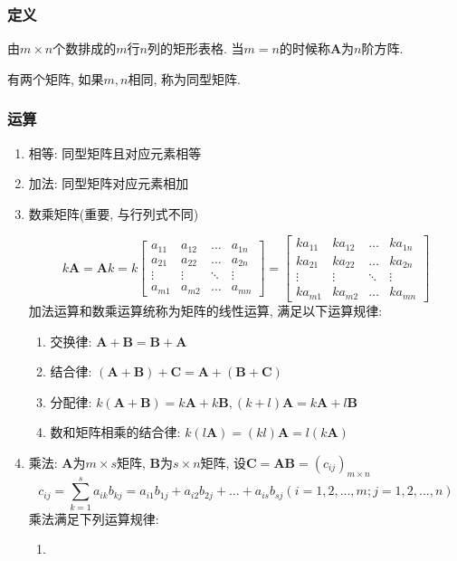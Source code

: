 \subsubsection{定义}
由$ m\times n $个数排成的$ m $行$ n $列的矩形表格. 当$ m=n $的时候称$ \bm{A} $为$ n $阶方阵.\par 有两个矩阵, 如果$ m,n $相同, 称为同型矩阵.
\subsubsection{运算}
\begin{enumerate}
	\item 相等: 同型矩阵且对应元素相等
	\item 加法: 同型矩阵对应元素相加
	\item 数乘矩阵(重要, 与行列式不同)\par 
	\begin{equation*}
		k\bm{A} = \bm{A}k = k \begin{bmatrix}
		a_{11}	& a_{12}  & \dots & a_{1n} \\
		a_{21}	& a_{22} & \dots & a_{2n} \\
		\vdots	& \vdots & \ddots & \vdots \\
		a_{m1}	& a_{m2} & \dots & a_{mn} 
		\end{bmatrix} = 
	    \begin{bmatrix}
	    ka_{11}	& ka_{12}  & \dots & ka_{1n} \\
	    ka_{21}	& ka_{22} & \dots & ka_{2n} \\
	    \vdots	& \vdots & \ddots & \vdots \\
	    ka_{m1}	& ka_{m2} & \dots & ka_{mn} 
	    \end{bmatrix}
	\end{equation*}
    加法运算和数乘运算统称为矩阵的线性运算, 满足以下运算规律:
    \begin{enumerate}
	\item 交换律: $ \bm{A}+\bm{B}=\bm{B}+\bm{A} $
	\item 结合律: $ (\bm{A}+\bm{B})+\bm{C}=\bm{A}+(\bm{B}+\bm{C}) $
	\item 分配律: $ k(\bm{A}+\bm{B})=k\bm{A}+k\bm{B}, (k+l)\bm{A}=k\bm{A}+l\bm{B} $
	\item 数和矩阵相乘的结合律: $ k(l\bm{A})=(kl)\bm{A}=l(k\bm{A}) $
    \end{enumerate}
    \item 乘法: $ \bm{A} $为$ m\times s $矩阵, $ \bm{B} $为$ s\times n $矩阵, 设$ \bm{C}=\bm{A}\bm{B}=(c_{ij})_{m\times n} $
    \begin{equation*}
    	c_{ij}=\sum_{k=1}^{s}a_{ik}b_{kj}=a_{i1}b_{1j}+a_{i2}b_{2j}+...+a_{is}b_{sj}(i=1,2,...,m;j=1,2,...,n)
    \end{equation*}
    乘法满足下列运算规律:
    \begin{enumerate}
    	\item 
    \end{enumerate}
\end{enumerate}
